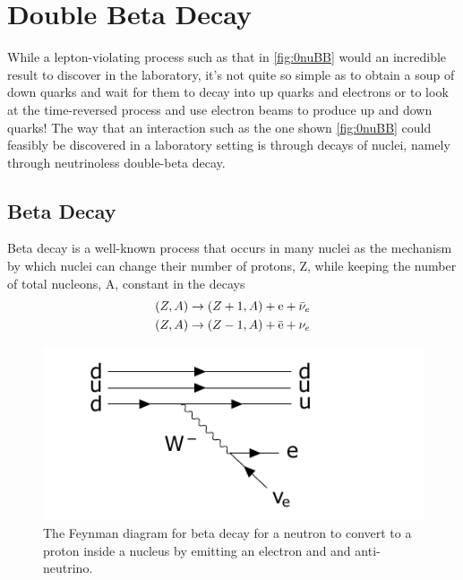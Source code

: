 \chapter{Double Beta Decay}
\label{chap:Beta Decay}

While a lepton-violating process such as that in \autoref{fig:0nuBB} would an incredible result to discover in the laboratory, it's not quite so simple as to obtain a soup of down quarks and wait for them to decay into up quarks and electrons or to look at the time-reversed process and use electron beams to produce up and down quarks! The way that an interaction such as the one shown \autoref{fig:0nuBB} could feasibly be discovered in a laboratory setting is through decays of nuclei, namely through neutrinoless double-beta decay. 

\section{Beta Decay}
\label{sec:Beta Decay}
Beta decay is a well-known process that occurs in many nuclei as the mechanism by which nuclei can change their number of protons, Z, while keeping the number of total nucleons, A, constant in the decays
\begin{align}
    (Z, A) & \rightarrow (Z+1, A)+\textrm{e}+\Bar{\nu}_e \label{eq:neutrondecay} \\
    (Z, A) & \rightarrow (Z-1, A)+\Bar{\textrm{e}}+\nu_e \label{eq:protondecay} 
\end{align}

\begin{figure}[tbph]
    \centering
    \includegraphics[width=0.8\linewidth]{Figures/NeutronBetaDecay.pdf}
    \caption[Beta Decay Feynman diagram for a neutron converting to a proton]{The Feynman diagram for beta decay for a neutron to convert to a proton inside a nucleus by emitting an electron and and anti-neutrino.}
    \label{fig:NeutronBetaDecay}
    
\end{figure}

